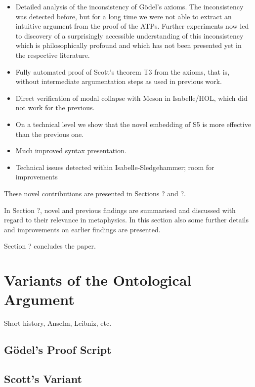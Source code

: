 \documentclass{article}
\begin{document}
\begin{itemize}
\item Detailed analysis of the inconsistency of G\"{o}del's axioms. The
inconsistency was detected before, but for a long time we were not
able to extract an intuitive argument from the proof of the ATPs.
Further experiments now led to discovery of a surprisingly accessible
understanding of this inconsistency which is philosophically profound
and which has not been presented yet in the respective literature.

\item Fully automated proof of Scott's theorem T3 from the axioms, that
   is, without intermediate argumentation steps as used in previous
   work.

\item Direct verification of modal collapse with Meson in Isabelle/HOL,
which did not work for the previous.

\item On a technical level we show that the novel embedding of S5 is more
    effective than the previous one.

\item Much improved syntax presentation.

\item Technical issues detected within Isabelle-Sledgehammer; room for improvements
\end{itemize}

These novel contributions are presented in Sections ? and ?.

In Section ?, novel and previous findings are summarised and discussed 
with regard to their relevance in metaphysics. In this section also 
some further details and improvements on earlier 
findings are presented.

Section ? concludes the paper.



\section{Variants of the Ontological Argument}
Short history, Anselm, Leibniz, etc.
\subsection{G\"{o}del's Proof Script}
\subsection{Scott's Variant}
\end{document}
